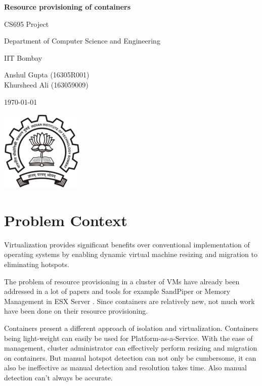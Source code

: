 \documentclass[a4paper, 11pt]{article}
\begin{document}
\begin{titlepage}
\begin{center}
\vspace*{1cm}

\huge{\textbf{Resource provisioning of containers}}

\Large{CS695 Project}

\vspace{3.5cm}
\Large{Department of Computer Science and Engineering}

\Large{IIT Bombay}

\vspace{1.5cm}

\Large{Anshul Gupta (16305R001) \\ Khursheed Ali (163059009)}

\vspace{1cm}
\today
\vfill

\vspace{0.8cm}

\includegraphics[scale=0.6]{IITB.png}
\end{center}
\end{titlepage}

\newpage
\tableofcontents
\newpage

\section{Problem Context}
\indent \indent Virtualization provides significant benefits over conventional implementation of operating systems by enabling dynamic virtual machine resizing and migration to eliminating hotspots.

The problem of resource provisioning in a cluster of VMs have already been addressed in a lot of papers and tools for example SandPiper \cite{sandpiper} or Memory Management in ESX Server \cite{memmgmt}. Since containers are relatively new, not much work have been done on their resource provisioning.

Containers present a different approach of isolation and virtualization. Containers being light-weight can easily be used for Platform-as-a-Service. With the ease of management, cluster administrator can effectively perform resizing and migration on containers. But manual hotspot detection can not only be cumbersome, it can also be ineffective as manual detection and resolution takes time. Also manual detection can't always be accurate. 
\end{document}

